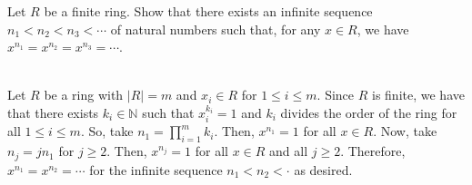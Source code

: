Let $R$ be a finite ring. Show that there exists an infinite sequence $n_1<n_2<n_3<\cdots$ of natural
numbers such that, for any $x\in R$, we have $x^{n_1}=x^{n_2}=x^{n_3}=\cdots$.\\

\begin{solution}\renewcommand{\qedsymbol}{}\ \\
    Let $R$ be a ring with $|R|=m$ and $x_i\in R$ for $1\leq i\leq m$. Since $R$ is finite, we have that
    there exists $k_i\in\mathbb{N}$ such that $x^{k_i}_i=1$ and $k_i$ divides the order of the ring for
    all $1\leq i\leq m$. So, take $n_1=\prod_{i=1}^mk_i$. Then, $x^{n_1}=1$ for all $x\in R$. Now, take
    $n_j=jn_1$ for $j\geq2$. Then, $x^{n_j}=1$ for all $x\in R$ and all $j\geq2$. Therefore,
    $x^{n_1}=x^{n_2}=\cdots$ for the infinite sequence $n_1<n_2<\cdot$ as desired.

\end{solution}